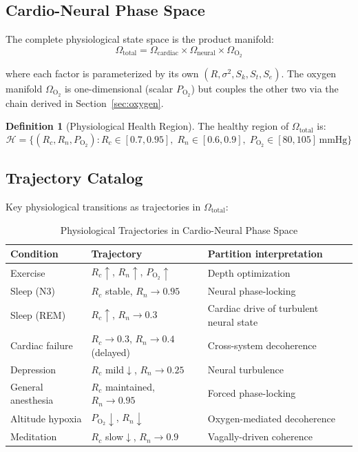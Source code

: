 \documentclass[10pt,twocolumn,a4paper]{article}
\theoremstyle{definition}
\newtheorem{definition}{Definition}
\begin{document}
\subsection{Cardio-Neural Phase Space}

The complete physiological state space is the product manifold:
\begin{equation}
\Omega_{\text{total}} = \Omega_{\text{cardiac}} \times \Omega_{\text{neural}} \times \Omega_{\text{O}_2}
\end{equation}

where each factor is parameterized by its own $(R, \sigma^2, S_k, S_t, S_e)$.
The oxygen manifold $\Omega_{\text{O}_2}$ is one-dimensional (scalar $P_{\text{O}_2}$)
but couples the other two via the chain derived in Section~\ref{sec:oxygen}.

\begin{definition}[Physiological Health Region]
The healthy region of $\Omega_{\text{total}}$ is:
\begin{equation}
\mathcal{H} = \{(R_c, R_n, P_{\text{O}_2}) : R_c \in [0.7, 0.95],\;
R_n \in [0.6, 0.9],\; P_{\text{O}_2} \in [80, 105]\,\text{mmHg}\}
\end{equation}
\end{definition}

\subsection{Trajectory Catalog}

Key physiological transitions as trajectories in $\Omega_{\text{total}}$:

\begin{table}[H]
\centering
\caption{Physiological Trajectories in Cardio-Neural Phase Space}
\label{tab:trajectories}
\begin{tabular}{lll}
\toprule
\textbf{Condition} & \textbf{Trajectory} & \textbf{Partition interpretation}\\
\midrule
Exercise & $R_c \uparrow$, $R_n \uparrow$, $P_{\text{O}_2} \uparrow$ & Depth optimization\\
Sleep (N3) & $R_c$ stable, $R_n \to 0.95$ & Neural phase-locking\\
Sleep (REM) & $R_c \uparrow$, $R_n \to 0.3$ & Cardiac drive of turbulent neural state\\
Cardiac failure & $R_c \to 0.3$, $R_n \to 0.4$ (delayed) & Cross-system decoherence\\
Depression & $R_c$ mild$\downarrow$, $R_n \to 0.25$ & Neural turbulence\\
General anesthesia & $R_c$ maintained, $R_n \to 0.95$ & Forced phase-locking\\
Altitude hypoxia & $P_{\text{O}_2} \downarrow$, $R_n \downarrow$ & Oxygen-mediated decoherence\\
Meditation & $R_c$ slow$\downarrow$, $R_n \to 0.9$ & Vagally-driven coherence\\
\bottomrule
\end{tabular}
\end{table}
\end{document}

